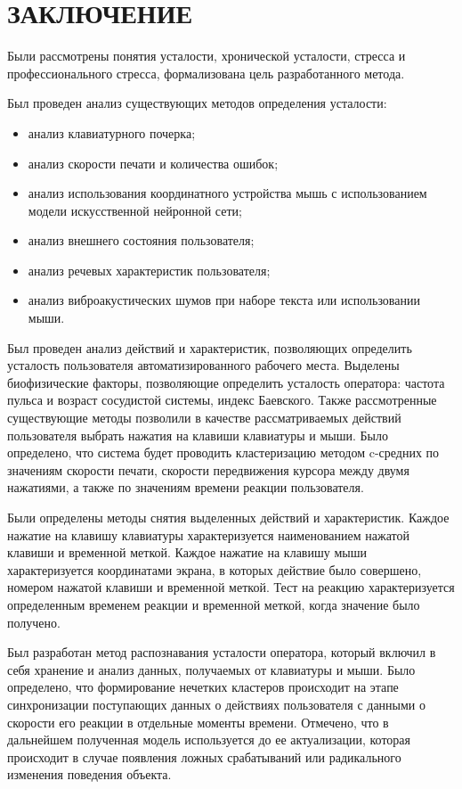 \section*{ЗАКЛЮЧЕНИЕ}

Были рассмотрены понятия усталости, хронической усталости, стресса и профессионального стресса, формализована цель разработанного метода.

Был проведен анализ существующих методов определения усталости:

\begin{itemize}[leftmargin=1.6\parindent]
\item анализ клавиатурного почерка;
\item анализ скорости печати и количества ошибок;
\item анализ использования координатного устройства мышь с использованием модели искусственной нейронной сети;
\item анализ внешнего состояния пользователя;
\item анализ речевых характеристик пользователя;
\item анализ виброакустических шумов при наборе текста или использовании мыши.
\end{itemize}

Был проведен анализ действий и характеристик, позволяющих определить усталость пользователя автоматизированного рабочего места. Выделены биофизические факторы, позволяющие определить усталость оператора: частота пульса и возраст сосудистой системы, индекс Баевского. Также рассмотренные существующие методы позволили в качестве рассматриваемых действий пользователя выбрать нажатия на клавиши клавиатуры и мыши. Было определено, что система будет проводить кластеризацию методом c-средних по значениям скорости печати, скорости передвижения курсора между двумя нажатиями, а также по значениям времени реакции пользователя.

Были определены методы снятия выделенных действий и характеристик. Каждое нажатие на клавишу клавиатуры характеризуется наименованием нажатой клавиши и временной меткой. Каждое нажатие на клавишу мыши характеризуется координатами экрана, в которых действие было совершено, номером нажатой клавиши и временной меткой. Тест на реакцию характеризуется определенным временем реакции и временной меткой, когда значение было получено.

Был разработан метод распознавания усталости оператора, который включил в себя хранение и анализ данных, получаемых от клавиатуры и мыши. Было определено, что формирование нечетких кластеров происходит на этапе синхронизации поступающих данных о действиях пользователя с данными о скорости его реакции в отдельные моменты времени. Отмечено, что в дальнейшем полученная модель используется до ее актуализации, которая происходит в случае появления ложных срабатываний или радикального изменения поведения объекта.

